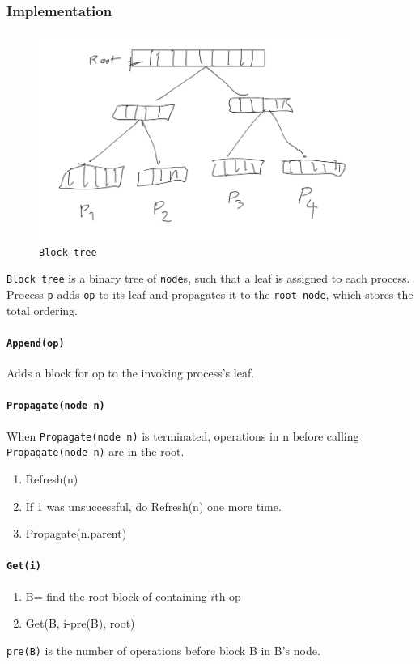 \documentclass[12pt]{article}
\begin{document}
\subsubsection{Implementation}
\begin{figure}[hbt]
  \center\includegraphics[width=4in]{pics/tree}
  \caption{\texttt{Block tree}}
\end{figure}
\texttt{‌Block tree} is a binary tree of \texttt{node}s, such that a leaf is assigned to each process. Process \texttt{p} adds \texttt{op} to its leaf and propagates it to the \texttt{root node}, which stores the total ordering.
\paragraph{\texttt{Append(op)}}
Adds a block for op to the invoking process's leaf.
\paragraph{\texttt{Propagate(node n)}}
When \texttt{Propagate(node n)} is terminated, operations in n before calling \texttt{Propagate(node n)} are in the root.
\begin{enumerate}
  \item Refresh(n)
  \item If 1 was unsuccessful, do Refresh(n) one more time.
  \item Propagate(n.parent)
\end{enumerate}
\paragraph{\texttt{Get(i)}}
\begin{enumerate}
  \item B= find the root block of containing $i$th op
  \item Get(B, i-pre(B), root)
\end{enumerate}
\texttt{pre(B)} is the number of operations before block B in B's node.
\end{document}
